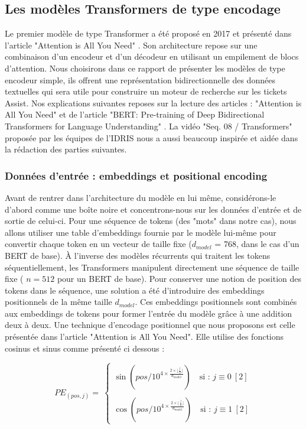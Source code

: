 \documentclass[12pt]{article}
\theoremstyle{definition}
\begin{document}
\subsection{Les modèles Transformers de type encodage}
Le premier modèle de type Transformer a été proposé en 2017 et présenté dans l’article "Attention is All You Need" \cite{a_i_a_y_n}. Son architecture repose sur une combinaison d'un encodeur et d'un décodeur en utilisant un empilement de blocs d’attention. Nous choisirons dans ce rapport de présenter les modèles de type encodeur simple, ils offrent une représentation bidirectionnelle des données textuelles qui sera utile pour construire un moteur de recherche sur les tickets Assist. Nos explications suivantes reposes sur la lecture des articles : "Attention is All You Need" \cite{a_i_a_y_n} et de l'article "BERT: Pre-training of Deep Bidirectional Transformers for
Language Understanding" \cite{bert_paper}. La vidéo "Seq. 08 / Transformers" proposée par les équipes de l'IDRIS \cite{video_trans} nous a aussi beaucoup inspirée et aidée dans la rédaction des parties suivantes.

\subsubsection{Données d'entrée : embeddings et positional encoding}

Avant de rentrer dans l'architecture du modèle en lui même, considérons-le d'abord comme une boîte noire et concentrons-nous sur les données d’entrée et de sortie de celui-ci. Pour une séquence de tokens (des "mots" dans notre cas), nous allons utiliser une table d'embeddings fournie par le modèle lui-même pour convertir chaque token en un vecteur de taille fixe ($d_{model}$ = 768, dans le cas d’un BERT de base). À l’inverse des modèles récurrents qui traitent les tokens séquentiellement, les Transformers manipulent directement une séquence de taille fixe ( $n=512$ pour un BERT de base). Pour conserver une notion de position des tokens dans le séquence, une solution a été d'introduire des embeddings positionnels de la même taille $d_{model}$. Ces embeddings positionnels sont combinés aux embeddings de tokens pour former l'entrée du modèle grâce à une addition deux à deux. Une technique d'encodage positionnel que nous proposons est celle présentée dans l'article "Attention is All You Need". Elle utilise des fonctions cosinus et sinus comme présenté ci dessous :  

$$PE_{(pos,j)} = \ \left\{\begin{array}{c}
	\sin\left(pos/10^{4 \times \frac{2 \times\lfloor \frac{j}{2} \rfloor}{d_{model}}} \right) \quad \text{si  : } j \equiv 0 ~[2]\\\quad\\
	\cos\left(pos/10^{4 \times \frac{2 \times \lfloor \frac{j}{2} \rfloor}{d_{model}}} \right) \quad \text{si  : } j \equiv 1 ~[2]
\end{array}\right.$$
\end{document}
